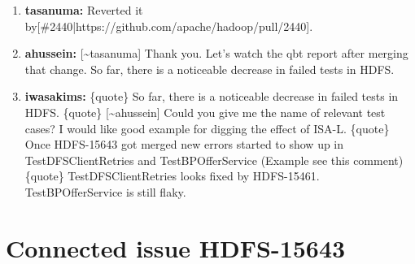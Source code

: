 \documentclass{report}%
\begin{document}
\begin{enumerate}
\item%
\textbf{tasanuma: }Reverted it by{[}\#2440|https://github.com/apache/hadoop/pull/2440{]}.%
\item%
\textbf{ahussein: }{[}\textasciitilde{}tasanuma{]} Thank you.\newline%
\newline%
Let's watch the qbt report after merging that change.\newline%
\newline%
\newline%
\newline%
So far, there is a noticeable decrease in failed tests in HDFS. %
\item%
\textbf{iwasakims: }\{quote\}\newline%
\newline%
So far, there is a noticeable decrease in failed tests in HDFS.\newline%
\newline%
\{quote\}\newline%
\newline%
\newline%
\newline%
{[}\textasciitilde{}ahussein{]} Could you give me the name of relevant test cases? I would like good example for digging the effect of ISA{-}L.\newline%
\newline%
\newline%
\newline%
\{quote\}\newline%
\newline%
Once HDFS{-}15643 got merged new errors started to show up in TestDFSClientRetries and TestBPOfferService (Example see this comment)\newline%
\newline%
\{quote\}\newline%
\newline%
\newline%
\newline%
TestDFSClientRetries looks fixed by HDFS{-}15461. TestBPOfferService is still flaky.\newline%
\newline%
%
\end{enumerate}

%
\chapter{Connected issue HDFS{-}15643}%
\label{chap:ConnectedissueHDFS{-}15643}%
\end{document}
